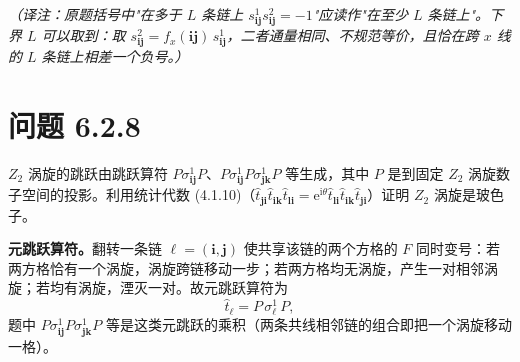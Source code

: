 \emph{（译注：原题括号中"在多于 $L$ 条链上 $s^1_{\pmb{ij}}s^2_{\pmb{ij}}=-1$"应读作"在至少 $L$ 条链上"。下界 $L$ 可以取到：取 $s^2_{\pmb{ij}}=f_x(\pmb{ij})\,s^1_{\pmb{ij}}$，二者通量相同、不规范等价，且恰在跨 $x$ 线的 $L$ 条链上相差一个负号。）}

\section*{问题 6.2.8}
\begin{problem}
$Z_2$ 涡旋的跳跃由跳跃算符 $P\sigma^1_{\pmb{ij}}P$、$P\sigma^1_{\pmb{ij}}P\sigma^1_{\pmb{jk}}P$ 等生成，其中 $P$ 是到固定 $Z_2$ 涡旋数子空间的投影。利用统计代数 (4.1.10)（$\hat t_{\pmb{ji}}\hat t_{\pmb{ik}}\hat t_{\pmb{li}}=\mathrm{e}^{\mathrm{i}\theta}\hat t_{\pmb{li}}\hat t_{\pmb{ik}}\hat t_{\pmb{ji}}$）证明 $Z_2$ 涡旋是玻色子。
\end{problem}
\solution

\textbf{元跳跃算符。}翻转一条链 $\ell=(\pmb i,\pmb j)$ 使共享该链的两个方格的 $F$ 同时变号：若两方格恰有一个涡旋，涡旋跨链移动一步；若两方格均无涡旋，产生一对相邻涡旋；若均有涡旋，湮灭一对。故元跳跃算符为
\begin{equation*}
\hat t_{\ell}=P\,\sigma^1_{\ell}\,P ,
\end{equation*}
题中 $P\sigma^1_{\pmb{ij}}P\sigma^1_{\pmb{jk}}P$ 等是这类元跳跃的乘积（两条共线相邻链的组合即把一个涡旋移动一格）。

